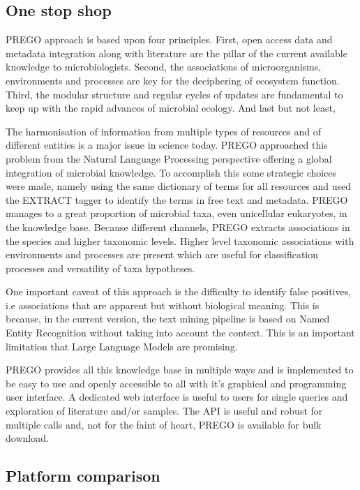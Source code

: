    \subsection{One stop shop}
   \label{subsec:prego-contents-disc}

PREGO approach is based upon four principles. First, open access data and
metadata integration along with literature are the pillar of the current
available knowledge to microbiologists. Second, the associations of microorganisms,
environments and processes are key for the deciphering of ecosystem function.
Third, the modular structure and regular cycles of updates are fundamental to
keep up with the rapid advances of microbial ecology. And last but not least,

The harmonisation of information from multiple types of resources and of different
entities is a major issue in science today. PREGO approached this problem from 
the Natural Language Processing perspective offering a global integration 
of microbial knowledge. To accomplish this some strategic choices were made, 
namely using the same dictionary of terms for all resources and used 
the EXTRACT tagger to identify the terms in free text and metadata.
PREGO manages to a great proportion of microbial taxa, even unicellular eukaryotes, in the knowledge base.
Because different channels, PREGO extracts associations in the species and higher taxonomic levels.
Higher level taxonomic associations with environments and processes are present
which are useful for classification processes and versatility of taxa hypotheses.

One important caveat of this approach is the difficulty to 
identify false positives, i.e associations that are apparent but without 
biological meaning. This is because, in the current version, the text mining
pipeline is based on Named Entity Recognition without taking into account 
the context. This is an important limitation that Large Language Models 
are promising.

PREGO provides all this knowledge base in multiple 
ways and is implemented to be easy to use and openly accessible to all with it’s graphical and programming user interface.
A dedicated web interface is useful to users for single queries
and exploration of literature and/or samples. The API is useful and 
robust for multiple calls and, not for the faint of heart, PREGO is 
available for bulk download. 

   \subsection{Platform comparison}
   \label{subsec:prego-similar-platforms}


